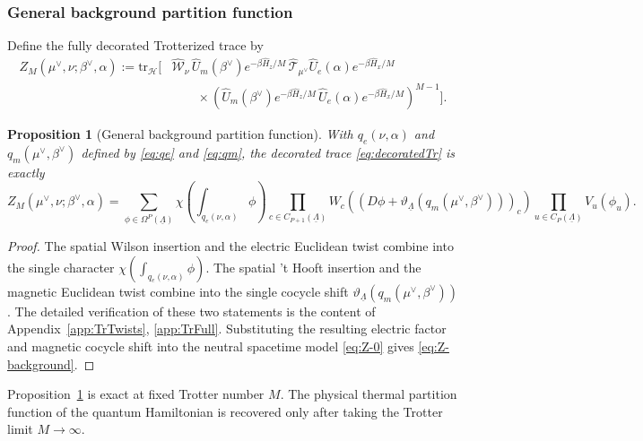 \documentclass[dvipsnames,a4paper]{article}
\numberwithin{equation}{section}
\newtheorem{prop}[theorem]{Proposition}
\theoremstyle{definition}
\theoremstyle{remark}
\newcommand{\tr}{\mathrm{tr}}
\begin{document}
\subsubsection{General background partition function}
\label{sec:general-background-partition}

Define the fully decorated Trotterized trace by
\begin{equation}
	\begin{aligned}
		Z_M(\mu^\vee,\nu;\beta^\vee,\alpha)
		:=
		\tr_{\mathcal H}\biggl[
		&\hat{\mathcal W}_\nu\,
		\hat U_m(\beta^\vee)e^{-\beta\hat H_z/M}\,
		\hat{\mathcal T}_{\mu^\vee}\hat U_e(\alpha)e^{-\beta\hat H_x/M}
		\\
		&\qquad\times
		\left(
		\hat U_m(\beta^\vee)e^{-\beta\hat H_z/M}\,
		\hat U_e(\alpha)e^{-\beta\hat H_x/M}
		\right)^{M-1}
		\biggr].
	\end{aligned}
	\label{eq:decoratedTr}
\end{equation}

\begin{prop}[General background partition function]
	\label{prop:ZtwistedSpatial}
	With \(q_e(\nu,\alpha)\) and \(q_m(\mu^\vee,\beta^\vee)\) defined by
	\eqref{eq:qe} and \eqref{eq:qm}, the decorated
	trace \eqref{eq:decoratedTr} is exactly
	\begin{equation}
		Z_M(\mu^\vee,\nu;\beta^\vee,\alpha)
		=
		\sum_{\phi\in\Omega^P(\underline\Lambda)}
		\chi\left(\int_{q_e(\nu,\alpha)}\phi\right)
		\prod_{c\in C_{P+1}(\underline\Lambda)}
		W_c\left(
		(D\phi+\vartheta_{\underline\Lambda}(q_m(\mu^\vee,\beta^\vee)))_c
		\right)
		\prod_{u\in C_P(\underline\Lambda)}
		V_u(\phi_u).
		\label{eq:Z-background}
	\end{equation}
\end{prop}

\begin{proof}
	The spatial Wilson insertion and the electric Euclidean twist combine into the single
	character $\chi\left(\int_{q_e(\nu,\alpha)}\phi\right)$.
	The spatial 't Hooft insertion and the magnetic Euclidean twist combine into the single
	cocycle shift $\vartheta_{\underline\Lambda}(q_m(\mu^\vee,\beta^\vee))$.
	The detailed verification of these two statements is the content of
	Appendix~\ref{app:TrTwists}, \ref{app:TrFull}. Substituting the resulting electric factor and
	magnetic cocycle shift into the neutral spacetime model
	\eqref{eq:Z-0} gives \eqref{eq:Z-background}.
\end{proof}


Proposition~\ref{prop:ZtwistedSpatial} is exact at fixed Trotter number \(M\). The physical thermal partition function of the quantum Hamiltonian is recovered only after taking the Trotter limit \(M\to\infty\).
\end{document}
